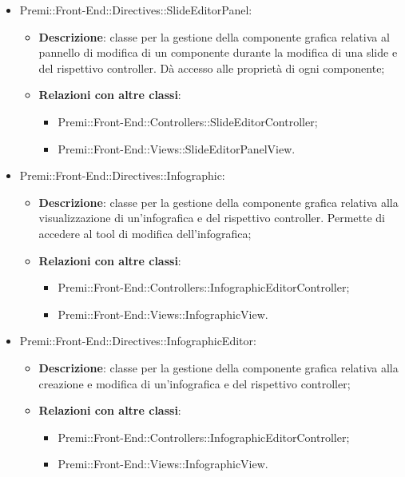 \begin{itemize}
    \item Premi::Front-End::Directives::SlideEditorPanel:
	\begin{itemize}
		\item \textbf{Descrizione}: classe per la gestione della componente grafica relativa al pannello di modifica di un componente durante la modifica di una slide e del rispettivo controller. Dà accesso alle proprietà di ogni componente;
		\item \textbf{Relazioni con altre classi}:
		\begin{itemize}
			\item Premi::Front-End::Controllers::SlideEditorController;
			\item Premi::Front-End::Views::SlideEditorPanelView.
		\end{itemize}
	\end{itemize}

    \item Premi::Front-End::Directives::Infographic:
	\begin{itemize}
		\item \textbf{Descrizione}: classe per la gestione della componente grafica relativa alla visualizzazione di un'\gls{infografica} e del rispettivo controller. Permette di accedere al tool di modifica dell'\gls{infografica};
		\item \textbf{Relazioni con altre classi}:
		\begin{itemize}
			\item Premi::Front-End::Controllers::InfographicEditorController;
			\item Premi::Front-End::Views::InfographicView.
		\end{itemize}
	\end{itemize}

    \item Premi::Front-End::Directives::InfographicEditor:
	\begin{itemize}
		\item \textbf{Descrizione}: classe per la gestione della componente grafica relativa alla creazione e modifica di un'\gls{infografica} e del rispettivo controller;
		\item \textbf{Relazioni con altre classi}:
		\begin{itemize}
			\item Premi::Front-End::Controllers::InfographicEditorController;
			\item Premi::Front-End::Views::InfographicView.
		\end{itemize}
	\end{itemize}

\end{itemize}

